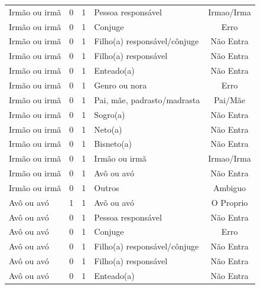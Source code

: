 \documentclass[
	12pt,				%
	openright,			%
	twoside,			%
	a4paper,			%
	english,			%
	french,				%
	spanish,			%
	brazil				%
	]{abntex2}
\begin{document}
\begin{anexosenv}
\begin{longtable}{@{}lcclc@{}}
Irmão ou irmã                & 0         & 1        & Pessoa responsável           & Irmao/Irma      \\
Irmão ou irmã                & 0         & 1        & Conjuge                      & Erro            \\
Irmão ou irmã                & 0         & 1        & Filho(a) responsável/cônjuge & Não Entra       \\
Irmão ou irmã                & 0         & 1        & Filho(a) responsável         & Não Entra       \\
Irmão ou irmã                & 0         & 1        & Enteado(a)                   & Não Entra       \\
Irmão ou irmã                & 0         & 1        & Genro ou nora                & Erro            \\
Irmão ou irmã                & 0         & 1        & Pai, mãe, padrasto/madrasta  & Pai/Mãe         \\
Irmão ou irmã                & 0         & 1        & Sogro(a)                     & Não Entra       \\
Irmão ou irmã                & 0         & 1        & Neto(a)                      & Não Entra       \\
Irmão ou irmã                & 0         & 1        & Bisneto(a)                   & Não Entra       \\
Irmão ou irmã                & 0         & 1        & Irmão ou irmã                & Irmao/Irma      \\
Irmão ou irmã                & 0         & 1        & Avô ou avó                   & Não Entra       \\
Irmão ou irmã                & 0         & 1        & Outros                       & Ambiguo         \\
Avô ou avó                   & 1         & 1        & Avô ou avó                   & O Proprio       \\
Avô ou avó                   & 0         & 1        & Pessoa responsável           & Não Entra       \\
Avô ou avó                   & 0         & 1        & Conjuge                      & Erro            \\
Avô ou avó                   & 0         & 1        & Filho(a) responsável/cônjuge & Não Entra       \\
Avô ou avó                   & 0         & 1        & Filho(a) responsável         & Não Entra       \\
Avô ou avó                   & 0         & 1        & Enteado(a)                   & Não Entra       \\

\end{longtable}
\end{anexosenv}
\end{document}
